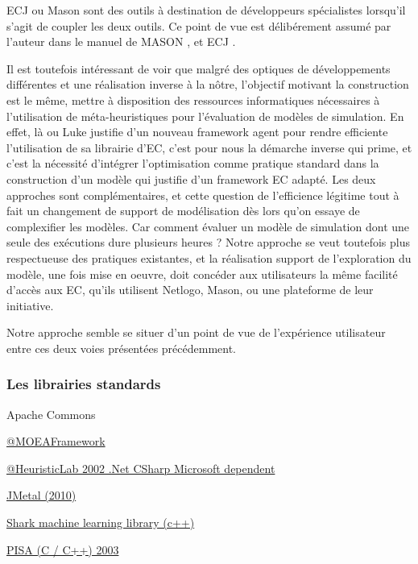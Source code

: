 ECJ ou Mason sont des outils à destination de développeurs spécialistes lorsqu'il s'agit de coupler les deux outils. Ce point de vue est délibérement assumé par l'auteur dans le manuel de MASON , et ECJ . 
 
Il est toutefois intéressant de voir que malgré des optiques de développements différentes et une réalisation inverse à la nôtre, l'objectif motivant la construction est le même, mettre à disposition des ressources informatiques nécessaires à l'utilisation de méta-heuristiques pour l'évaluation de modèles de simulation. En effet, là ou Luke justifie d'un nouveau framework agent pour rendre efficiente l'utilisation de sa librairie d'EC, c'est pour nous la démarche inverse qui prime, et c'est la nécessité d'intégrer l'optimisation comme pratique standard dans la construction d'un modèle qui justifie d'un framework EC adapté. Les deux approches sont complémentaires, et cette question de l'efficience légitime tout à fait un changement de support de modélisation dès lors qu'on essaye de complexifier les modèles. Car comment évaluer un modèle de simulation dont une seule des exécutions dure plusieurs heures ? Notre approche se veut toutefois plus respectueuse des pratiques existantes, et la réalisation support de l'exploration du modèle, une fois mise en oeuvre, doit concéder aux utilisateurs la même facilité d'accès aux EC, qu'ils utilisent Netlogo, Mason, ou une plateforme de leur initiative.

Notre approche semble se situer d'un point de vue de l'expérience utilisateur entre ces deux voies présentées précédemment.

\subsubsection{Les librairies standards}

Apache Commons

\href{http://www.moeaframework.org/}{@MOEAFramework}

\href{http://dev.heuristiclab.com/}{@HeuristicLab 2002 .Net CSharp Microsoft dependent}

\href{http://jmetal.sourceforge.net/}{JMetal (2010)}

\href{http://image.diku.dk/shark/sphinx_pages/build/html/index.html}{Shark machine learning library (c++)}

\href{http://www.tik.ee.ethz.ch/sop/pisa/?page=documentation.php}{PISA (C / C++) 2003}

